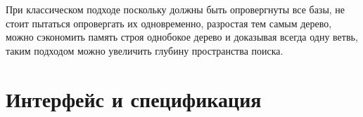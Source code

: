 При классическом подходе поскольку должны быть опровергнуты все базы, не стоит пытаться опровергать их одновременно, разростая тем самым дерево, можно сэкономить память строя однобокое дерево и доказывая всегда одну ветвь, таким подходом можно увеличить глубину пространства поиска.


\section{Интерфейс и спецификация}




